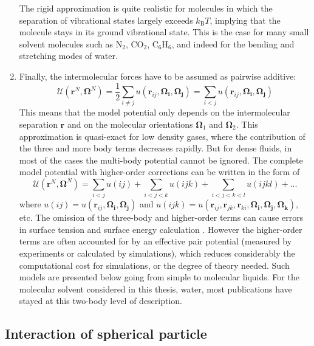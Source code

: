 \begin{enumerate}
The rigid approximation is quite realistic for molecules in which
the separation of vibrational states largely exceeds $k_{\mathrm{B}}T$,
implying that the molecule stays in its ground vibrational state.
This is the case for many small solvent molecules such as $\mathrm{N_{2}}$,
$\mathrm{CO_{2}}$, $\mathrm{C_{6}H_{6}}$, and indeed for the bending
and stretching modes of water. 
\item Finally, the intermolecular forces have to be assumed as pairwise
additive:
\begin{equation}
\mathcal{U}(\mathbf{r}^{N},\mathbf{\Omega}^{N})=\frac{1}{2}\sum_{i\neq j}u(\mathbf{r}_{ij},\mathbf{\Omega_{i}},\mathbf{\Omega_{j}})=\sum_{i<j}u(\mathbf{r}_{ij},\mathbf{\Omega_{i}},\mathbf{\Omega_{j}})\label{eq:pair-potential}
\end{equation}
This means that the model potential only depends on the intermolecular
separation $\mathbf{r}$ and on the molecular orientations $\mathbf{\Omega}_{1}$
and $\mathbf{\Omega}_{2}$. This approximation is quasi-exact for
low density gases, where the contribution of the three and more body
terms decreases rapidly. But for dense fluids, in most of the cases
the multi-body potential cannot be ignored. The complete model potential
with higher-order corrections can be written in the form of
\begin{equation}
\mathcal{U}(\mathbf{r}^{N},\mathbf{\Omega}^{N})=\sum_{i<j}u(ij)+\sum_{i<j<k}u(ijk)+\sum_{i<j<k<l}u(ijkl)+...
\end{equation}
where $u(ij)=u(\mathbf{r}_{ij},\mathbf{\Omega_{i}},\mathbf{\Omega_{j}})$
and $u(ijk)=u(\mathbf{r}_{ij},\mathbf{r}_{jk},\mathbf{r}_{ki},\mathbf{\Omega_{i}},\mathbf{\Omega_{j}},\mathbf{\Omega_{k}})$,
etc. The omission of the three-body and higher-order terms can cause errors in surface tension and surface energy calculation
\citep{Miyazaki_1975}. However the higher-order terms are often accounted
for by an effective pair potential (measured by experiments or calculated
by simulations), which reduces considerably the computational cost
for simulations, or the degree of theory needed. Such models are presented
below going from simple to molecular liquids. For the molecular solvent
considered in this thesis, water, most publications have stayed at
this two-body level of description. 
\end{enumerate}

\subsection{Interaction of spherical particle}

